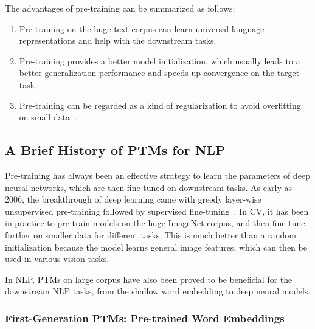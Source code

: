 \documentclass[fleqn]{SCYE-arxiv}
\begin{document}
\begin{multicols}{2}
The advantages of pre-training can be summarized as follows:
\begin{enumerate}
  \item Pre-training on the huge text corpus can learn universal language representations and help with the downstream tasks.
  \item Pre-training provides a better model initialization, which usually leads to a better generalization performance and speeds up convergence on the target task.
  \item Pre-training can be regarded as a kind of regularization to avoid overfitting on small data~\cite{DBLP:journals/jmlr/ErhanBCMVB10}.
\end{enumerate}




\subsection{A Brief History of PTMs for NLP}

Pre-training has always been an effective strategy to learn the parameters of deep neural networks, which are then fine-tuned on downstream tasks.
As early as 2006, the breakthrough of deep learning came with greedy layer-wise unsupervised pre-training followed by supervised fine-tuning~\cite{hinton2006reducing}.
In CV, it has been in practice to pre-train models on the huge ImageNet corpus, and then fine-tune further on smaller data for different tasks.
This is much better than a random initialization because the model learns general image features, which can then be used in various vision tasks.

In NLP, PTMs on large corpus have also been proved to be beneficial for the downstream NLP tasks, from the shallow word embedding to deep neural models.

\subsubsection{First-Generation PTMs: Pre-trained Word Embeddings}


\end{multicols}
\end{document}
